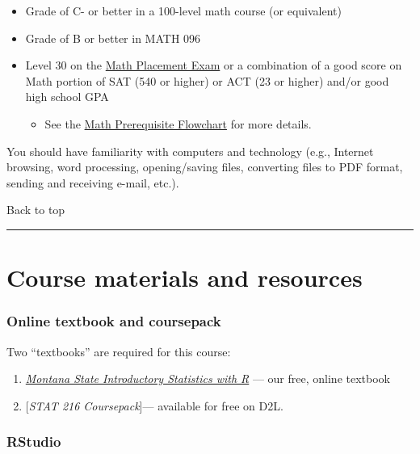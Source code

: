 \documentclass[
]{article}
\providecommand{\tightlist}{%
  \setlength{\itemsep}{0pt}\setlength{\parskip}{0pt}}
\begin{document}
\begin{itemize}
\tightlist
\item
  Grade of C- or better in a 100-level math course (or equivalent)
\item
  Grade of B or better in MATH 096
\item
  Level 30 on the \href{http://www.montana.edu/testing/MPLEX.html}{Math
  Placement Exam} or a combination of a good score on Math portion of
  SAT (540 or higher) or ACT (23 or higher) and/or good high school GPA

  \begin{itemize}
  \tightlist
  \item
    See the
    \href{http://www.math.montana.edu/undergrad/documents/MHiearchyFlowchart.pdf}{Math
    Prerequisite Flowchart} for more details.
  \end{itemize}
\end{itemize}

You should have familiarity with computers and technology (e.g.,
Internet browsing, word processing, opening/saving files, converting
files to PDF format, sending and receiving e-mail, etc.).

Back to top

\begin{center}\rule{0.5\linewidth}{0.5pt}\end{center}

\section{Course materials and
resources}\label{course-materials-and-resources}

\subsubsection{Online textbook and
coursepack}\label{online-textbook-and-coursepack}

Two ``textbooks'' are required for this course:

\begin{enumerate}
\def\labelenumi{\arabic{enumi}.}
\tightlist
\item
  \href{https://mtstateintrostats.github.io/IntroStatTextbook/}{\emph{Montana
  State Introductory Statistics with R}} --- our free, online textbook
\item
  {[}\emph{STAT 216 Coursepack}{]}--- available for free on D2L.
\end{enumerate}

\subsubsection{RStudio}\label{rstudio}
\end{document}
